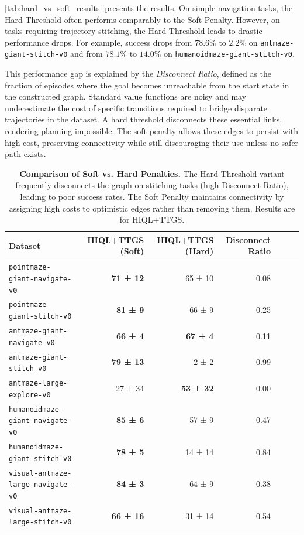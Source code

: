 \documentclass{article} %
\begin{document}
\autoref{tab:hard_vs_soft_results} presents the results. On simple navigation tasks, the Hard Threshold often performs comparably to the Soft Penalty. However, on tasks requiring trajectory stitching, the Hard Threshold leads to drastic performance drops. For example, success drops from $78.6\%$ to $2.2\%$ on \texttt{antmaze-giant-stitch-v0} and from $78.1\%$ to $14.0\%$ on \texttt{humanoidmaze-giant-stitch-v0}.

This performance gap is explained by the \emph{Disconnect Ratio}, defined as the fraction of episodes where the goal becomes unreachable from the start state in the constructed graph. Standard value functions are noisy and may underestimate the cost of specific transitions required to bridge disparate trajectories in the dataset. A hard threshold disconnects these essential links, rendering planning impossible. The soft penalty allows these edges to persist with high cost, preserving connectivity while still discouraging their use unless no safer path exists.

\begin{table}[H]
    \centering
    \caption{\textbf{Comparison of Soft vs. Hard Penalties.} The Hard Threshold variant frequently disconnects the graph on stitching tasks (high Disconnect Ratio), leading to poor success rates. The Soft Penalty maintains connectivity by assigning high costs to optimistic edges rather than removing them. Results are for HIQL+TTGS.}
    \label{tab:hard_vs_soft_results}
    \scriptsize
    \setlength{\tabcolsep}{1.4pt}
    \renewcommand{\arraystretch}{1.5}
    \begin{tabular*}{\linewidth}{@{\extracolsep{\fill}} lrrrrrr}
    \toprule
    \textbf{Dataset} & \textbf{HIQL+TTGS (Soft)} & \textbf{HIQL+TTGS (Hard)} & \textbf{Disconnect Ratio} \\
    \midrule
    \texttt{pointmaze-giant-navigate-v0} & \textbf{71 ± 12} & 65 ± 10 & 0.08 \\
    \texttt{pointmaze-giant-stitch-v0} & \textbf{81 ± 9} & 66 ± 9 & 0.25 \\
    \midrule
    \texttt{antmaze-giant-navigate-v0} & \textbf{66 ± 4} & \textbf{67 ± 4} & 0.11 \\
    \texttt{antmaze-giant-stitch-v0} & \textbf{79 ± 13} & 2 ± 2 & 0.99 \\
    \texttt{antmaze-large-explore-v0} & 27 ± 34 & \textbf{53 ± 32} & 0.00 \\
    \midrule
    \texttt{humanoidmaze-giant-navigate-v0} & \textbf{85 ± 6} & 57 ± 9 & 0.47 \\
    \texttt{humanoidmaze-giant-stitch-v0} & \textbf{78 ± 5} & 14 ± 14 & 0.84 \\
    \midrule
    \texttt{visual-antmaze-large-navigate-v0} & \textbf{84 ± 3} & 64 ± 9 & 0.38 \\
    \texttt{visual-antmaze-large-stitch-v0} & \textbf{66 ± 16} & 31 ± 14 & 0.54 \\
    \bottomrule
    \end{tabular*}
\end{table}
\end{document}
